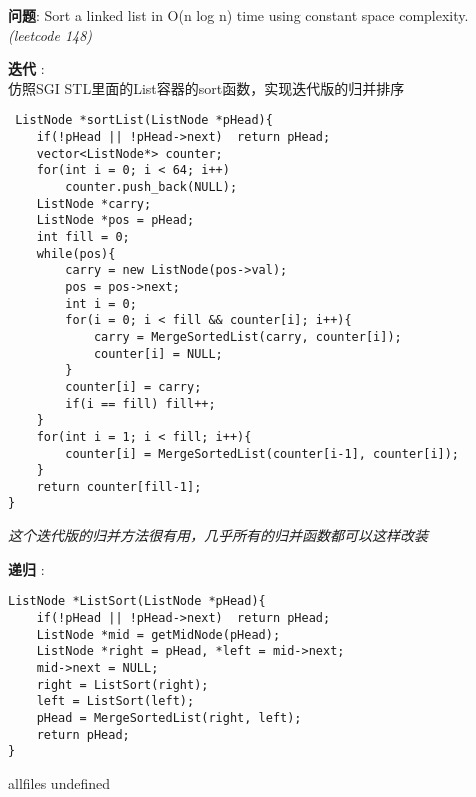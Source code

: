 \documentclass{article}
\begin{document}
\begin{CJK}{UTF8}{gbsn}     %

\else
    
\begin{description}
    \item{\textbf{问题}}: Sort a linked list in O(n log n) time using constant space complexity. \textit{(leetcode 148)}
    \item{\textbf{迭代}} : 
    \\仿照SGI STL里面的List容器的sort函数，实现迭代版的归并排序
    \begin{lstlisting}
 ListNode *sortList(ListNode *pHead){
    if(!pHead || !pHead->next)  return pHead;
    vector<ListNode*> counter;
    for(int i = 0; i < 64; i++)
        counter.push_back(NULL);
    ListNode *carry;
    ListNode *pos = pHead;
    int fill = 0;
    while(pos){
        carry = new ListNode(pos->val);
        pos = pos->next;
        int i = 0;
        for(i = 0; i < fill && counter[i]; i++){
            carry = MergeSortedList(carry, counter[i]);
            counter[i] = NULL;
        }
        counter[i] = carry;
        if(i == fill) fill++;
    }
    for(int i = 1; i < fill; i++){
        counter[i] = MergeSortedList(counter[i-1], counter[i]);
    }
    return counter[fill-1];
}
    \end{lstlisting}
    \textit{这个迭代版的归并方法很有用，几乎所有的归并函数都可以这样改装}
    \item{\textbf{递归}} : 
	\begin{lstlisting}
ListNode *ListSort(ListNode *pHead){
	if(!pHead || !pHead->next)	return pHead;
	ListNode *mid = getMidNode(pHead);
	ListNode *right = pHead, *left = mid->next;
	mid->next = NULL;
	right = ListSort(right);
	left = ListSort(left);
	pHead = MergeSortedList(right, left);
	return pHead;
}
	\end{lstlisting}
\end{description}

\fi

\ifx allfiles undefined
\end{CJK}
\end{document}
